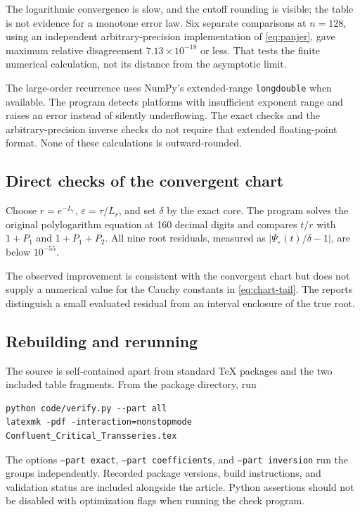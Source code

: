 \documentclass[11pt,a4paper]{article}
\numberwithin{equation}{section}
\theoremstyle{definition}
\theoremstyle{remark}
\newcommand{\eps}{\varepsilon}
\begin{document}
The logarithmic convergence is slow, and the cutoff rounding is visible;
the table is not evidence for a monotone error law. Six separate comparisons
at \(n=128\), using an independent arbitrary-precision implementation of
\eqref{eq:panjer}, gave maximum relative disagreement
\(7.13\times10^{-18}\) or less. That tests the finite numerical calculation,
not its distance from the asymptotic limit.

The large-order recurrence uses NumPy's extended-range \texttt{longdouble}
when available. The program detects platforms with insufficient exponent
range and raises an error instead of silently underflowing. The exact checks
and the arbitrary-precision inverse checks do not require that extended
floating-point format. None of these calculations is outward-rounded.

\subsection{Direct checks of the convergent chart}
Choose \(r=e^{-L_r}\), \(\eps=\tau/L_r\), and set \(\delta\) by the exact
core. The program solves the original polylogarithm equation at 160 decimal
digits and compares \(t/r\) with \(1+P_1\) and \(1+P_1+P_2\).
All nine root residuals, measured as
\(|\Psi_\eps(t)/\delta-1|\), are below \(10^{-55}\).

\begin{table}[htbp]
\centering\small

\caption{Direct inversion diagnostics. The error columns are absolute
errors in the ratio \(t/r\), not in \(t\). The two approximations are the
Taylor polynomials by total degree from \eqref{eq:P1}--\eqref{eq:P2}.}
\label{tab:inversion}
\end{table}

The observed improvement is consistent with the convergent chart but does not
supply a numerical value for the Cauchy constants in
\eqref{eq:chart-tail}. The reports distinguish a small evaluated residual
from an interval enclosure of the true root.

\subsection{Rebuilding and rerunning}
The source is self-contained apart from standard TeX packages and the two
included table fragments. From the package directory, run
\begin{verbatim}
python code/verify.py --part all
latexmk -pdf -interaction=nonstopmode Confluent_Critical_Transseries.tex
\end{verbatim}
The options \texttt{--part exact}, \texttt{--part coefficients}, and
\texttt{--part inversion} run the groups independently. Recorded package
versions, build instructions, and validation status are included alongside
the article. Python assertions should not be disabled with optimization flags
when running the check program.
\end{document}

